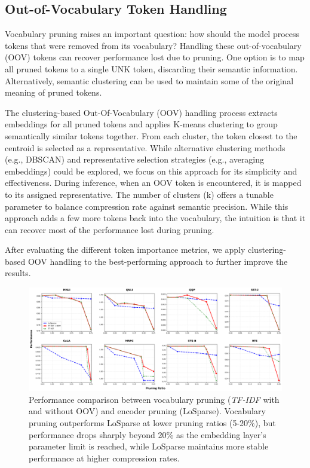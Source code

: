 \documentclass[twocolumn]{article}
\begin{document}
\subsection{Out-of-Vocabulary Token Handling}
Vocabulary pruning raises an important question: how should the model process tokens that were removed from its vocabulary? Handling these out-of-vocabulary (OOV) tokens can recover performance lost due to pruning.
One option is to map all pruned tokens to a single UNK token, discarding their semantic information.
Alternatively, semantic clustering can be used to maintain some of the original meaning of pruned tokens.

The clustering-based Out-Of-Vocabulary (OOV) handling process extracts embeddings for all pruned tokens and applies K-means clustering to group semantically similar tokens together. From each cluster, the token closest to the centroid is selected as a representative. While alternative clustering methods (e.g., DBSCAN) and representative selection strategies (e.g., averaging embeddings) could be explored, we focus on this approach for its simplicity and effectiveness. During inference, when an OOV token is encountered, it is mapped to its assigned representative.
The number of clusters (k) offers a tunable parameter to balance compression rate against semantic precision. While this approach adds a few more tokens back into the vocabulary, the intuition is that it can recover most of the performance lost during pruning.


After evaluating the different token importance metrics, we apply clustering-based OOV handling to the best-performing approach to further improve the results.

\begin{figure}[t]
    \centering
    \includegraphics[width=\linewidth]{images/pruning_ratios.png}
    \caption{Performance comparison between vocabulary pruning (\textit{TF-IDF} with and without OOV) and encoder pruning (LoSparse). Vocabulary pruning outperforms LoSparse at lower pruning ratios (5-20\%), but performance drops sharply beyond 20\% as the embedding layer's parameter limit is reached, while LoSparse maintains more stable performance at higher compression rates.}
    \label{fig:pruning_ratio}
\end{figure}
\end{document}
